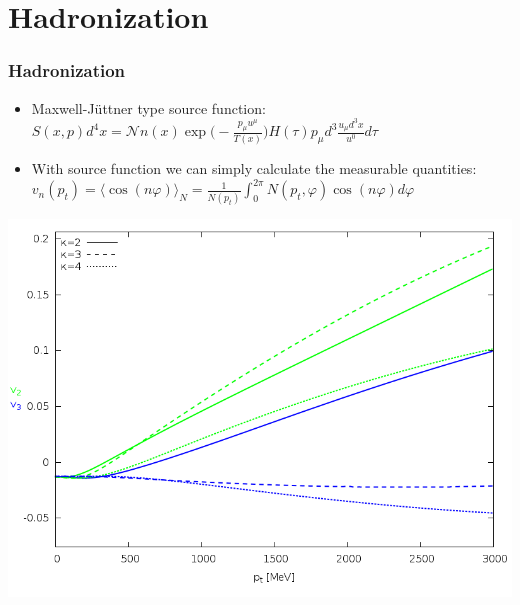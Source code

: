 \documentclass{beamer}
\begin{document}
\section{Hadronization}
\begin{frame}
\frametitle{Hadronization}
\begin{itemize}
\item Maxwell-Jüttner type source function: 
$S(x, p)d^4x=\mathcal{N}n(x)\exp{\bigg(-\frac{p_\mu u^\mu}{T(x)}\bigg)}H(\tau)p_\mu d^3\frac{u_\mu d^3x}{u^0} d\tau$
\item With source function we can simply calculate the measurable quantities:
$v_n(p_t)=\langle\cos(n\varphi)\rangle_{N}=\frac{1}{N(p_t)}\int_0^{2\pi} N(p_t, \varphi)\cos(n\varphi)d\varphi$
\end{itemize}
\begin{center}
\includegraphics[scale=0.24]{pic/res/rel/vn_kappa}
\end{center}
\end{frame}
\end{document}

